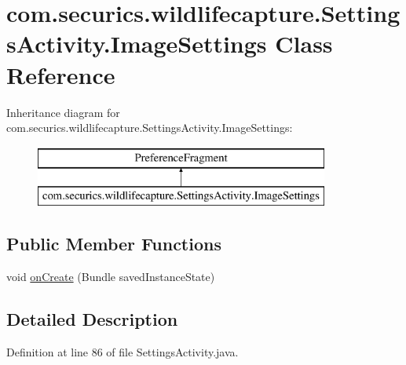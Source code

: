 \hypertarget{classcom_1_1securics_1_1wildlifecapture_1_1_settings_activity_1_1_image_settings}{\section{com.\+securics.\+wildlifecapture.\+Settings\+Activity.\+Image\+Settings Class Reference}
\label{classcom_1_1securics_1_1wildlifecapture_1_1_settings_activity_1_1_image_settings}
}
Inheritance diagram for com.\+securics.\+wildlifecapture.\+Settings\+Activity.\+Image\+Settings\+:\begin{figure}[H]
\begin{center}
\leavevmode
\includegraphics[height=2.000000cm]{classcom_1_1securics_1_1wildlifecapture_1_1_settings_activity_1_1_image_settings}
\end{center}
\end{figure}
\subsection*{Public Member Functions}
\begin{DoxyCompactItemize}
\item 
void \hyperlink{classcom_1_1securics_1_1wildlifecapture_1_1_settings_activity_1_1_image_settings_ab943824ddf5b093a6e49e5c0781cde11}{on\+Create} (Bundle saved\+Instance\+State)
\end{DoxyCompactItemize}


\subsection{Detailed Description}


Definition at line 86 of file Settings\+Activity.\+java.



